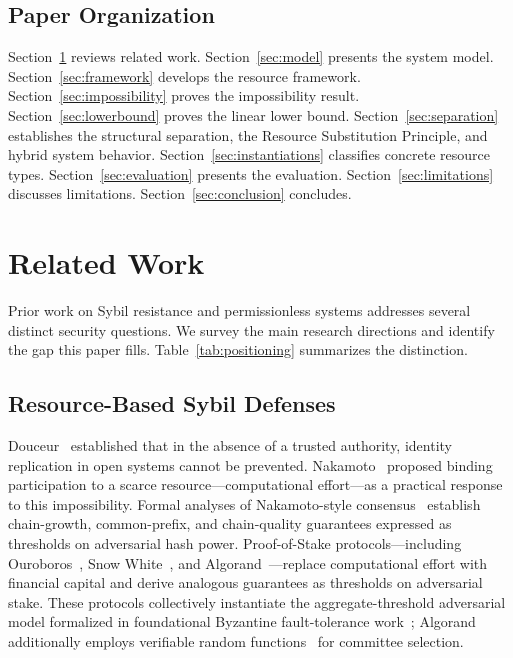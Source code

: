 \documentclass[10pt,journal,compsoc]{IEEEtran}
\theoremstyle{remark}
\begin{document}
	\subsection{Paper Organization}
	\label{ssec:organization}
	
	Section~\ref{sec:related} reviews related work.
	Section~\ref{sec:model} presents the system model.
	Section~\ref{sec:framework} develops the resource framework.
	Section~\ref{sec:impossibility} proves the impossibility result.
	Section~\ref{sec:lowerbound} proves the linear lower bound.
	Section~\ref{sec:separation} establishes the structural
	separation, the Resource Substitution Principle,
	and hybrid system behavior.
	Section~\ref{sec:instantiations} classifies concrete resource types.
	Section~\ref{sec:evaluation} presents the evaluation.
	Section~\ref{sec:limitations} discusses limitations.
	Section~\ref{sec:conclusion} concludes.
	
	\section{Related Work}
	\label{sec:related}
	
	Prior work on Sybil resistance and permissionless systems
	addresses several distinct security questions.
	We survey the main research directions and identify
	the gap this paper fills.
	Table~\ref{tab:positioning} summarizes the distinction.
	
	\subsection{Resource-Based Sybil Defenses}
	\label{ssec:rw_resource}
	
	Douceur~\cite{douceur2002sybil} established that in the
	absence of a trusted authority, identity replication in
	open systems cannot be prevented.
	Nakamoto~\cite{nakamoto2008bitcoin} proposed binding
	participation to a scarce resource---computational
	effort---as a practical response to this impossibility.
	Formal analyses of Nakamoto-style
	consensus~\cite{garay2015backbone,ren2019nakamoto,pass2017hybrid,pass2017fruitchains}
	establish chain-growth, common-prefix, and chain-quality
	guarantees expressed as thresholds on adversarial hash power.
	Proof-of-Stake protocols---including
	Ouroboros~\cite{kiayias2017ouroboros,kiayias2018ouroboros,kiayias2020genesis},
	Snow White~\cite{pass2016snowwhite},
	and Algorand~\cite{gilad2017algorand}---replace
	computational effort with financial capital and derive
	analogous guarantees as thresholds on adversarial stake.
	These protocols collectively instantiate the
	aggregate-threshold adversarial model formalized in
	foundational Byzantine fault-tolerance
	work~\cite{lamport1982byzantine,castro1999pbft};
	Algorand additionally employs verifiable random
	functions~\cite{micali1999vrf} for committee selection.
	
\end{document}
